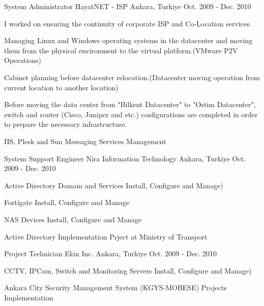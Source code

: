 \begin{cventries}

\cventry
    {System Administrator} %
    {HayatNET - ISP} %
    {Ankara, Turkiye} %
    {Oct. 2009 - Dec. 2010} %
    {
      \begin{cvitems} %
        \item {I worked on ensuring the continuity of corporate ISP and Co-Location services.}
        \item {Managing Linux and Windows operating systems in the datacenter and moving them from the physical environment to the virtual platform.(VMware P2V Operations)}
        \item {Cabinet planning before datacenter relocation.(Datacenter moving operation from current location to another location)}
        \item {Before moving the data center from "Bilkent Datacenter" to "Ostim Datacenter", switch and router (Cisco, Juniper and etc.) configurations are completed in order to prepare the necessary infrastructure.}
        \item {IIS, Plesk and Sun Messaging Services Management}
        \end{cvitems} 
    }
  

\cventry
    {System Support Engineer} %
    {Nira Information Technology} %
    {Ankara, Turkiye} %
    {Oct. 2009 - Dec. 2010} %
    {
      \begin{cvitems} %
        \item {Active Directory Domain and Services Install, Configure and Manage)}
        \item {Fortigate Install, Configure and Manage}
        \item {NAS Devices Install, Configure and Manage}
        \item {Active Directory Implementation Prject at Ministry of Transport}
        \end{cvitems} 
    }

 \cventry
    {Project Technician} %
    {Ekin Inc.} %
    {Ankara, Turkiye} %
    {Oct. 2009 - Dec. 2010} %
    {
      \begin{cvitems} %
        \item {CCTV, IPCam, Switch and Monitoring Servers Install, Configure and Manage)}
        \item {Ankara City Security Management System (KGYS-MOBESE) Projects Implementation}
      \end{cvitems} 
    }
    
\end{cventries}
